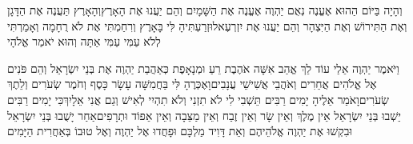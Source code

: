 \documentclass[../main/main.tex]{subfiles}
\begin{document}
\begin{multicols}{\ncols}
וְהָיָה בַּיּוֹם הַהוּא אֶעֱנֶה נְאֻם יַהְוֶה אֶעֱנֶה אֶת הַשָּׁמָיִם וְהֵם יַעֲנוּ אֶת הָאָרֶץ\PreVerseSpace{}וְהָאָרֶץ תַּעֲנֶה אֶת הַדָּגָן וְאֶת הַתִּירוֹשׁ וְאֶת הַיִּצְהָר וְהֵם יַעֲנוּ אֶת יִזְרְעֶאל\PreVerseSpace{}וּזְרַעְתִּיהָ לִּי בָּאָרֶץ וְרִחַמְתִּי אֶת לֹא רֻחָמָה וְאָמַרְתִּי לְלֹא עַמִּי עַמִּי אַתָּה וְהוּא יֹאמַר אֱלֹהָי\OpenSection{}\par
{}וַיֹּאמֶר יַהְוֶה אֵלַי עוֹד לֵךְ אֱהַב אִשָּׁה אֹהֶבֶת\SubEnd{} רֵעַ וּמְנָאָפֶת כְּאַהֲבַת יַהְוֶה אֶת בְּנֵי יִשְׂרָאֵל וְהֵם פֹּנִים אֶל אֱלֹהִים אֲחֵרִים וְאֹהֲבֵי אֲשִׁישֵׁי עֲנָבִים\PreVerseSpace{}וָאֶכְּרֶהָ לִּי בַּחֲמִשָּׁה עָשָׂר כָּסֶף וְחֹמֶר שְׂעֹרִים וְלֵתֶךְ שְׂעֹרִים\PreVerseSpace{}וָאֹמַר אֵלֶיהָ יָמִים רַבִּים תֵּשְׁבִי לִי לֹא תִזְנִי וְלֹא תִהְיִי לְאִישׁ וְגַם אֲנִי אֵלָיִךְ\PreVerseSpace{}כִּי יָמִים רַבִּים יֵשְׁבוּ בְּנֵי יִשְׂרָאֵל אֵין מֶלֶךְ וְאֵין שָׂר וְאֵין זֶבַח וְאֵין מַצֵּבָה וְאֵין אֵפוֹד וּתְרָפִים\PreVerseSpace{}אַחַר יָשֻׁבוּ בְּנֵי יִשְׂרָאֵל וּבִקְשׁוּ אֶת יַהְוֶה אֱלֹהֵיהֶם וְאֵת דָּוִיד מַלְכָּם וּפָחֲדוּ אֶל יַהְוֶה וְאֶל טוּבוֹ בְּאַחֲרִית הַיָּמִים\OpenSection{}\par

\end{multicols}
\end{document}
